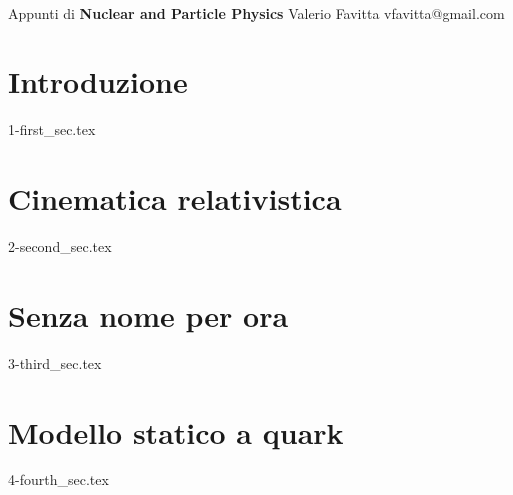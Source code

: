 \documentclass[11pt]{article}
\begin{document}
\newcommand*\subtxt[1]{_{\textnormal{#1}}}
\DeclareRobustCommand\_{\ifmmode\expandafter\subtxt\else\textunderscore\fi}

\thispagestyle{empty}
\bigskip \
\vspace{0.1cm}

\begin{center}
{\fontsize{22}{22} \selectfont Appunti di}
\vskip 16pt
{\fontsize{36}{36} \selectfont \bf \sffamily Nuclear and Particle Physics}
\vskip 24pt
{\fontsize{18}{18} \selectfont \rmfamily Valerio Favitta} 
\vskip 6pt
{\fontsize{14}{14} \selectfont \ttfamily vfavitta@gmail.com} 
\vskip 24pt
\end{center}

{\parindent0pt \baselineskip=15.5pt \lipsum[1-4]}

\newpage
\microtoc
\newpage

\section{Introduzione}\label{sec:intro}
{1-first_sec.tex}

\section{Cinematica relativistica}
{2-second_sec.tex}

\section{Senza nome per ora}
{3-third_sec.tex}


\section{Modello statico a quark}
{4-fourth_sec.tex}
\end{document}

